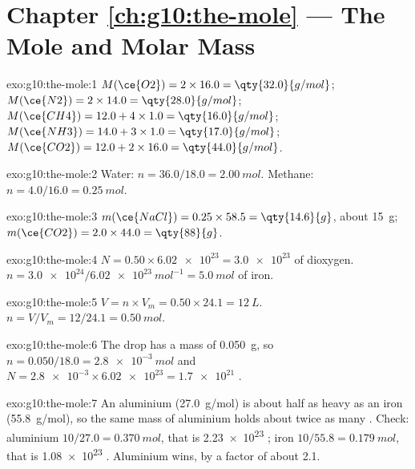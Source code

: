 \section*{Chapter \ref{ch:g10:the-mole} --- The Mole and Molar Mass}

\begin{solution}{exo:g10:the-mole:1}
$M(\ce{O2}) = 2 \times 16.0 = \qty{32.0}{g/mol}$;
$M(\ce{N2}) = 2 \times 14.0 = \qty{28.0}{g/mol}$;
$M(\ce{CH4}) = 12.0 + 4 \times 1.0 = \qty{16.0}{g/mol}$;
$M(\ce{NH3}) = 14.0 + 3 \times 1.0 = \qty{17.0}{g/mol}$;
$M(\ce{CO2}) = 12.0 + 2 \times 16.0 = \qty{44.0}{g/mol}$.
\end{solution}

\begin{solution}{exo:g10:the-mole:2}
Water: $n = 36.0 / 18.0 = \qty{2.00}{mol}$. Methane:
$n = 4.0 / 16.0 = \qty{0.25}{mol}$.
\end{solution}

\begin{solution}{exo:g10:the-mole:3}
$m(\ce{NaCl}) = 0.25 \times 58.5 = \qty{14.6}{g}$, about \qty{15}{g};
$m(\ce{CO2}) = 2.0 \times 44.0 = \qty{88}{g}$.
\end{solution}

\begin{solution}{exo:g10:the-mole:4}
$N = 0.50 \times \num{6.02e23} = \num{3.0e23}$  of dioxygen.
$n = \num{3.0e24} / \qty{6.02e23}{mol^{-1}} = \qty{5.0}{mol}$ of iron.
\end{solution}

\begin{solution}{exo:g10:the-mole:5}
$V = n \times V_m = 0.50 \times 24.1 = \qty{12}{L}$.
$n = V / V_m = 12 / 24.1 = \qty{0.50}{mol}$.
\end{solution}

\begin{solution}{exo:g10:the-mole:6}
The drop has a mass of \qty{0.050}{g}, so
$n = 0.050 / 18.0 = \qty{2.8e-3}{mol}$ and
$N = \num{2.8e-3} \times \num{6.02e23} = \num{1.7e21}$ .
\end{solution}

\begin{solution}{exo:g10:the-mole:7}
An aluminium  (\qty{27.0}{g/mol}) is about half as heavy as an iron
 (\qty{55.8}{g/mol}), so the same mass of aluminium holds about
twice as many . Check: aluminium $10/27.0 = \qty{0.370}{mol}$, that
is \num{2.23e23} ; iron $10/55.8 = \qty{0.179}{mol}$, that is
\num{1.08e23} . Aluminium wins, by a factor of about 2.1.
\end{solution}

